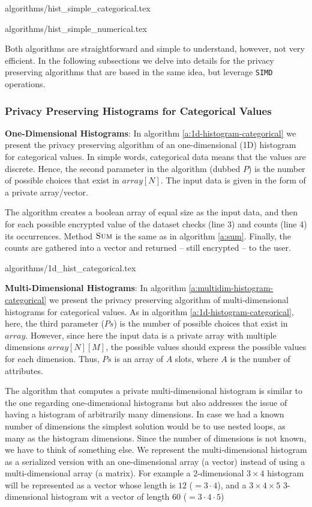 {algorithms/hist_simple_categorical.tex}

{algorithms/hist_simple_numerical.tex}

Both algorithms are straightforward and simple to understand, however, not very efficient.
In the following subsections we delve into details for the privacy preserving algorithms that are based in the same idea, but leverage \texttt{SIMD} operations.


\subsubsection{Privacy Preserving Histograms for Categorical Values}\label{sss:histogram-categorical}
\textbf{One-Dimensional Histograms}: In algorithm \ref{a:1d-histogram-categorical} we present the privacy preserving algorithm of an one-dimensional (1D) histogram for categorical values.
In simple words, categorical data means that the values are discrete.
Hence, the second parameter in the algorithm (dubbed $P$) is the number of possible choices that exist in $array[N]$.
The input data is given in the form of a private array/vector.

The algorithm creates a boolean array of equal size as the input data, and then for each possible encrypted value of the dataset checks (line 3) and counts (line 4) its occurrences.
Method { $\textsc{Sum}$} is the same as in algorithm \ref{a:sum}.
Finally, the counts are gathered into a vector and returned -- still encrypted -- to the user.

{algorithms/1d_hist_categorical.tex}



\textbf{Multi-Dimensional Histograms}: In algorithm \ref{a:multidim-histogram-categorical} we present the privacy preserving algorithm of multi-dimensional histograms for categorical values.
As in algorithm \ref{a:1d-histogram-categorical}, here, the third parameter ($Ps$) is the number of possible choices that exist in $array$.
However, since here the input data is a private array with multiple dimensions $array[N][M]$, the possible values should express the possible values for each dimension.
Thus, $Ps$ is an array of $A$ slots, where $A$ is the number of attributes.


The algorithm that computes a private multi-dimensional histogram is similar to the one regarding one-dimensional histograms but also addresses the issue of having a histogram of arbitrarily many dimensions.
In case we had a known number of dimensions the simplest solution would be to use nested loops, as many as the histogram dimensions.
Since the number of dimensions is not known, we have to think of something else.
We represent the multi-dimensional histogram as a serialized version with an one-dimensional array (a vector) instead of using a multi-dimensional array (a matrix).
For example a 2-dimensional $3 \times 4$ histogram will be represented as a vector whose length is $ 12 $ ($= 3 \cdot 4$), and a $3 \times 4 \times 5$ 3-dimensional histogram wit a vector of length $ 60 $ ($= 3 \cdot 4 \cdot 5$)


